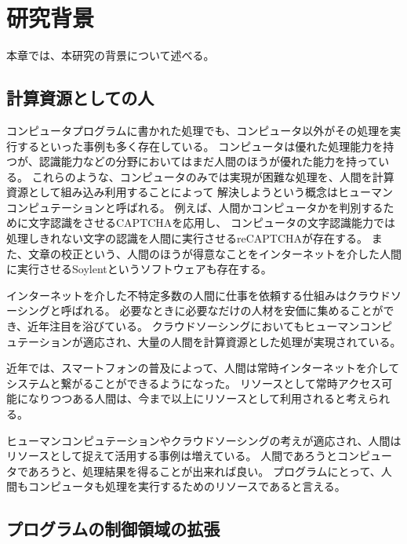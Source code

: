 \chapter{研究背景}\label{chap:background}

本章では、本研究の背景について述べる。

\section{計算資源としての人}\label{ux8a08ux7b97ux8cc7ux6e90ux3068ux3057ux3066ux306eux4eba}

コンピュータプログラムに書かれた処理でも、コンピュータ以外がその処理を実行するといった事例も多く存在している。
コンピュータは優れた処理能力を持つが、認識能力などの分野においてはまだ人間のほうが優れた能力を持っている。
これらのような、コンピュータのみでは実現が困難な処理を、人間を計算資源として組み込み利用することによって
解決しようという概念はヒューマンコンピュテーション\cite{humancomputation}と呼ばれる。
例えば、人間かコンピュータかを判別するために文字認識をさせるCAPTCHA\cite{captcha}を応用し、
コンピュータの文字認識能力では処理しきれない文字の認識を人間に実行させるreCAPTCHA\cite{recaptcha}が存在する。
また、文章の校正という、人間のほうが得意なことをインターネットを介した人間に実行させるSoylent\cite{soylent}というソフトウェアも存在する。

インターネットを介した不特定多数の人間に仕事を依頼する仕組みはクラウドソーシングと呼ばれる。
必要なときに必要なだけの人材を安価に集めることができ、近年注目を浴びている。
クラウドソーシングにおいてもヒューマンコンピュテーションが適応され、大量の人間を計算資源とした処理が実現されている。

近年では、スマートフォンの普及によって、人間は常時インターネットを介してシステムと繋がることができるようになった。
リソースとして常時アクセス可能になりつつある人間は、今まで以上にリソースとして利用されると考えられる。

ヒューマンコンピュテーションやクラウドソーシングの考えが適応され、人間はリソースとして捉えて活用する事例は増えている。
人間であろうとコンピュータであろうと、処理結果を得ることが出来れば良い。
プログラムにとって、人間もコンピュータも処理を実行するためのリソースであると言える。

\section{プログラムの制御領域の拡張}\label{ux30d7ux30edux30b0ux30e9ux30e0ux306eux5236ux5fa1ux9818ux57dfux306eux62e1ux5f35}

